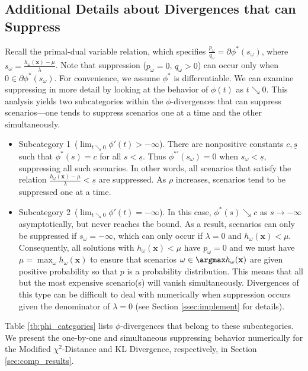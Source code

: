 \documentclass[12pt]{article}
\newcommand{\x}{\mathbf{x}}
\theoremstyle{plain}
\theoremstyle{definition}
\theoremstyle{remark}
\begin{document}
\subsection{Additional Details about Divergences that can Suppress}
\label{ssec:suppress}

Recall the primal-dual variable relation, which specifies $\frac{p_\omega}{q_\omega} = \partial \phi^*(s_\omega)$, where $s_\omega=\frac{h_{\omega}(\x)-\mu}{\lambda}$. 
Note that suppression ($p_\omega = 0$, $q_\omega > 0$) can occur only when $0 \in \partial \phi^*(s_\omega)$.
For convenience, we assume $\phi^*$ is differentiable.
We can examine suppressing in more detail by looking at the behavior of $\phi(t)$ as $t \searrow 0$.
This analysis yields two subcategories within the $\phi$-divergences that can suppress scenarios---one tends to suppress scenarios one at a time and the other simultaneously. 

\begin{itemize}
	\item {\sc Subcategory 1\ ($\lim_{t \searrow 0} \phi'(t) > -\infty$).}  There are nonpositive constants $c,\underline{s}$ such that $\phi^*(s) = c$ for all $s < \underline{s}$. 
		Thus $\phi^{*\prime}(s_\omega) = 0$ when $s_\omega < \underline{s}$, suppressing all such scenarios.
		In other words, all scenarios that satisfy the relation $\frac{h_\omega(\x)-\mu}{\lambda} < \underline{s}$ are suppressed.
		As $\rho$ increases, scenarios tend to be suppressed one at a time.

	\item {\sc Subcategory 2\ ($\lim_{t \searrow 0} \phi'(t) = -\infty$).} In this case, $\phi^*(s) \searrow c$ as $s \rightarrow -\infty$ asymptotically, but never reaches the bound.
		As a result, scenarios can only be suppressed if $s_\omega = -\infty$, which can only occur if $\lambda = 0$ and $h_\omega(\x) < \mu$.
		Consequently, all solutions with $h_\omega(\x) < \mu$ have $p_\omega=0$ and we must have $\mu = \max_\omega h_\omega(\x)$ to ensure that scenarios $\omega \in \argmax h_\omega(\x)$ are given positive probability so that $p$ is a probability distribution.
		This means that all but the most expensive scenario(s) will vanish simultaneously.
		Divergences of this type can be difficult to deal with numerically when suppression occurs given the denominator of $\lambda = 0$ (see Section \ref{ssec:implement} for details).
\end{itemize}


Table \ref{tb:phi_categories} lists $\phi$-divergences that belong to these subcategories. We present the one-by-one and simultaneous suppressing behavior numerically for the Modified $\chi^2$-Distance and KL Divergence, respectively, in Section \ref{sec:comp_results}.
\end{document}

